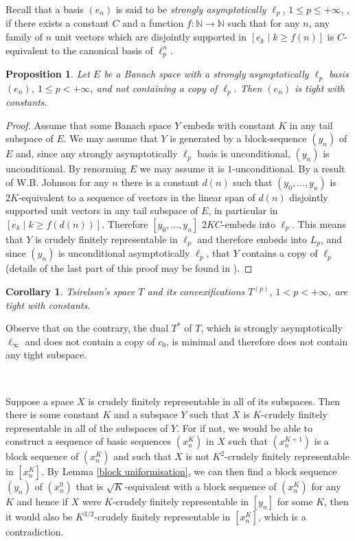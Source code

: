 \documentclass[10pt]{amsart}
\numberwithin{equation}{section}
\newtheorem{cor}[thm]{Corollary}
\newtheorem{prop} [thm] {Proposition}
\begin{document}
Recall that a basis $(e_n)$  is said to be {\em strongly asymptotically
$\ell_p$}, $1 {\ensuremath{\leqslant}} p {\ensuremath{\leqslant}} +\infty$, \cite{DFKO}, if there exists a constant $C$
and a function $f:{\mathbb N} \rightarrow {\mathbb N}$ such that for any $n$, any family of $n$
unit vectors which are disjointly supported in $[e_k { \; \big| \;} k {\ensuremath{\geqslant}} f(n)]$ is
$C$-equivalent to the canonical basis of $\ell_p^n$.

\begin{prop}\label{dfko}
Let $E$ be a Banach space with a strongly asymptotically $\ell_p$ basis
$(e_n)$, $1 {\ensuremath{\leqslant}} p<+\infty$, and not containing a copy of $\ell_p$. Then
$(e_n)$ is tight with constants.\end{prop}

\begin{proof}
Assume that some Banach space $Y$ embeds with constant $K$ in any tail subspace
of $E$. We may assume that $Y$ is generated by a block-sequence $(y_n)$ of $E$
and, since any strongly asymptotically $\ell_p$ basis is unconditional, $(y_n)$
is unconditional. By renorming $E$ we may assume it is $1$-unconditional. By a
result of W.B. Johnson \cite{J} for any $n$ there is a constant $d(n)$ such
that $(y_0,\ldots,y_n)$ is $2K$-equivalent to a sequence of vectors in the
linear span of $d(n)$ disjointly supported unit vectors in any tail subspace of
$E$, in particular in $[e_k { \; \big| \;} k {\ensuremath{\geqslant}} f(d(n))]$. Therefore $[y_0,\ldots,y_n]$
$2KC$-embeds into $\ell_p$. This means that $Y$ is crudely finitely
representable in $\ell_p$ and therefore embeds into $L_p$, and since $(y_n)$ is
unconditional asymptotically $\ell_p$, that $Y$ contains a copy of $\ell_p$
(details of the last part of this proof may be found in \cite{DFKO}).
\end{proof}

\begin{cor}\label{tsi}
Tsirelson's space $T$ and its convexifications $T^{(p)}$, $1<p<+\infty$, are
tight with constants.
\end{cor}

Observe that on the contrary, the dual $T^*$ of $T$, which is strongly
asymptotically $\ell_{\infty}$ and does not contain a copy of $c_0$, is minimal
and therefore does not contain any tight subspace.

\

Suppose a space $X$ is crudely finitely representable in all of its subspaces.
Then there is some constant $K$ and a subspace $Y$ such that $X$  is
$K$-crudely finitely representable in all of the subspaces of $Y$. For if not,
we would be able to construct a sequence of basic sequences $(x_n^K)$ in $X$
such that $(x_n^{K+1})$ is a block sequence of $(x_n^K)$ and such that $X$ is
not $K^2$-crudely finitely representable in $[x_n^{K}]$. By Lemma \ref{block
uniformisation}, we can then find a block sequence $(y_n)$ of $(x_n^0)$ that is
$\sqrt K$-equivalent with a block sequence of $(x_n^K)$ for any $K$ and hence
if $X$ were $K$-crudely finitely representable in $[y_n]$ for some $K$, then it
would also be $K^{3/2}$-crudely finitely representable in $[x_n^{K}]$, which is
a contradiction.
\end{document}
